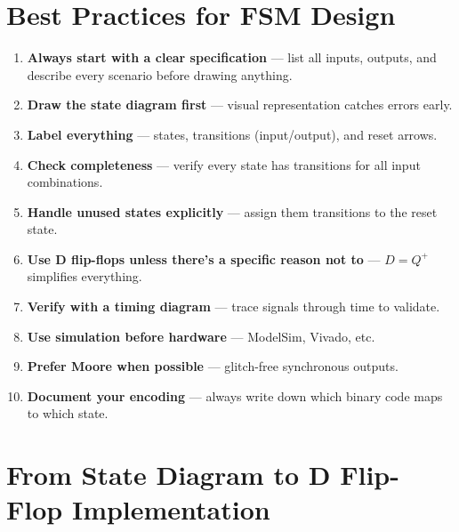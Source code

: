\documentclass[12pt,a4paper]{article}
\begin{document}
\section{Best Practices for FSM Design}

\begin{tipbox}
\begin{enumerate}[leftmargin=*]
  \item \textbf{Always start with a clear specification} --- list all inputs, outputs, and describe every scenario before drawing anything.

  \item \textbf{Draw the state diagram first} --- visual representation catches errors early.

  \item \textbf{Label everything} --- states, transitions (input/output), and reset arrows.

  \item \textbf{Check completeness} --- verify every state has transitions for all input combinations.

  \item \textbf{Handle unused states explicitly} --- assign them transitions to the reset state.

  \item \textbf{Use D flip-flops unless there's a specific reason not to} --- $D = Q^+$ simplifies everything.

  \item \textbf{Verify with a timing diagram} --- trace signals through time to validate.

  \item \textbf{Use simulation before hardware} --- ModelSim, Vivado, etc.

  \item \textbf{Prefer Moore when possible} --- glitch-free synchronous outputs.

  \item \textbf{Document your encoding} --- always write down which binary code maps to which state.
\end{enumerate}
\end{tipbox}


\section{From State Diagram to D Flip-Flop Implementation}
\label{sec:methodology}
\end{document}
